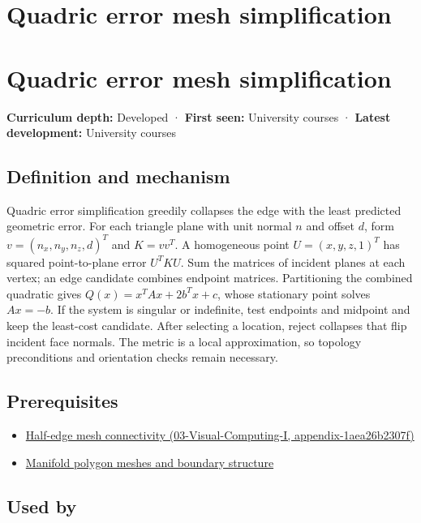\hypertarget{appendix-1dd4ad54ca57}{}
\section*{Quadric error mesh simplification}
\section{Quadric error mesh simplification}\label{appendix-1dd4ad54ca57-quadric-error-mesh-simplification}

\textbf{Curriculum depth:} Developed · \textbf{First seen:} University courses · \textbf{Latest development:} University courses

\subsection{Definition and mechanism}\label{appendix-1dd4ad54ca57-definition-and-mechanism}

Quadric error simplification greedily collapses the edge with the least predicted geometric error. For each triangle plane with unit normal \(n\) and offset \(d\), form \(v=(n_x,n_y,n_z,d)^T\) and \(K=vv^T\). A homogeneous point \(U=(x,y,z,1)^T\) has squared point-to-plane error \(U^TKU\). Sum the matrices of incident planes at each vertex; an edge candidate combines endpoint matrices. Partitioning the combined quadratic gives \(Q(x)=x^TAx+2b^Tx+c\), whose stationary point solves \(Ax=-b\). If the system is singular or indefinite, test endpoints and midpoint and keep the least-cost candidate. After selecting a location, reject collapses that flip incident face normals. The metric is a local approximation, so topology preconditions and orientation checks remain necessary.

\subsection{Prerequisites}\label{appendix-1dd4ad54ca57-prerequisites}

\begin{itemize}
\tightlist
\item
  \href{../03-Visual-Computing-I/main.pdf\#nameddest=appendix-1aea26b2307f}{Half-edge mesh connectivity (03-Visual-Computing-I, appendix-1aea26b2307f)}
\item
  \hyperref[appendix-fab348609369]{Manifold polygon meshes and boundary structure}
\end{itemize}

\subsection{Used by}\label{appendix-1dd4ad54ca57-used-by}

